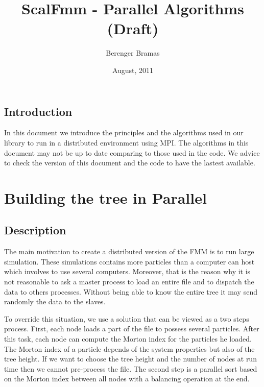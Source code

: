 \documentclass[10pt,letterpaper,titlepage]{report}
\author{Berenger Bramas}
\title{ScalFmm - Parallel Algorithms (Draft)}
\date{August, 2011}
\begin{document}
\maketitle{}
\newpage

\tableofcontents
\newpage


\section{Introduction}
In this document we introduce the principles and the algorithms used in our library to run in a distributed environment using MPI.
The algorithms in this document may not be up to date comparing to those used in the code.
We advice to check the version of this document and the code to have the lastest available.


\chapter{Building the tree in Parallel}
\section{Description}
The main motivation to create a distributed version of the FMM is to run large simulation.
These simulations contains more particles than a computer can host which involves to use several computers.
Moreover, that is the reason why it is not reasonable to ask a master process to load an entire file and to dispatch the data to others processes. Without being able to know the entire tree it may send randomly the data to the slaves.

To override this situation, we use a solution that can be viewed as a two steps process.
First, each node loads a part of the file to possess several particles.
After this task, each node can compute the Morton index for the particles he loaded.
The Morton index of a particle depends of the system properties but also of the tree height.
If we want to choose the tree height and the number of nodes at run time then we cannot pre-process the file.
The second step is a parallel sort based on the Morton index between all nodes with a balancing operation at the end.
\end{document}

